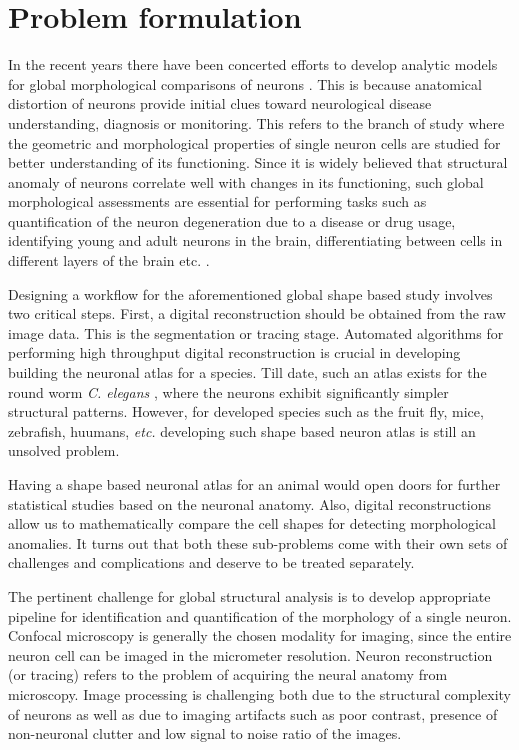 \section{Problem formulation}
In the recent years there have been concerted efforts to develop analytic models for global morphological comparisons of neurons \cite{meijering_survey}. This is because anatomical distortion of neurons provide initial clues toward neurological disease understanding, diagnosis or  monitoring. 
This refers to the branch of study where the geometric and morphological properties of single neuron cells are studied for better understanding of its functioning. Since it is widely believed that structural anomaly of neurons correlate well with changes in its functioning, such global morphological assessments are essential for performing  tasks such as quantification of the neuron degeneration due to a disease or drug usage, identifying young and adult neurons in the brain, differentiating between cells in different layers of the brain etc. \cite{vaccari2012assessment,neuron_structure,cuntz_neuron,barry_branching,barry_serotonergic,bio_belichenko1994rett}.

Designing a workflow for  the aforementioned global shape based study involves two critical steps. First, a digital reconstruction should be obtained from the raw image data. This is the segmentation or tracing stage. Automated algorithms for performing high throughput digital reconstruction is crucial in developing building the neuronal atlas for a species. Till date, such an atlas exists for the round worm \textit{C. elegans} \cite{cElegans}, where the neurons exhibit significantly simpler structural patterns. However, for developed species such as the fruit fly, mice, zebrafish, huumans, \textit{etc.} developing such shape based neuron atlas is still an unsolved problem.

Having a shape based neuronal atlas for an animal would open doors for further statistical studies based on the neuronal anatomy. Also, digital reconstructions allow us to mathematically compare the cell shapes for detecting morphological anomalies. It turns out that both these sub-problems come with their own sets of challenges and complications and deserve to be treated separately. 

The pertinent challenge for global structural analysis is to develop appropriate pipeline for identification and quantification of the morphology of a single neuron. Confocal microscopy is generally the chosen modality for imaging, since the entire neuron cell can be imaged in the micrometer resolution. Neuron reconstruction (or tracing) refers to the problem of acquiring the neural anatomy from microscopy.  Image processing is challenging both due to the structural complexity of neurons as well as due to imaging artifacts such as poor contrast, presence of non-neuronal clutter and low signal to noise ratio of the images. 

